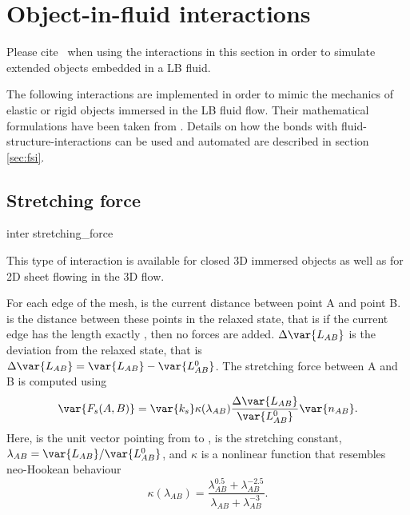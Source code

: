 \section{Object-in-fluid interactions}
\label{sec:inter-bonded-fsi}

\begin{citebox}
  Please cite~ when using the interactions
  in this section in order to simulate extended objects embedded in a
  LB fluid.
\end{citebox}

The following interactions are implemented in order to mimic the mechanics of 
elastic or rigid objects immersed in the LB fluid flow. Their mathematical formulations 
have been taken from \cite{dupin07}. Details on how the bonds with fluid-structure-interactions 
can be used and automated are described in section \ref{sec:fsi}.

\subsection{Stretching force}

\begin{essyntax}
  inter 
  stretching_force
   
\end{essyntax}
This type of interaction is available for closed 3D immersed objects as well as 
for 2D sheet flowing in the 3D flow. 

For each edge of the mesh,  is the current distance between point A 
and point B.  is the distance between these points in the relaxed 
state, that is if the current edge has the length exactly , then 
no forces are added. $\Delta \var{L_{AB}}$ is the deviation from the relaxed 
state, that is $\Delta \var{L_{AB}} = \var{L_{AB}} - \var{L_{AB}^0}$. The 
stretching force between A and B is computed using 
\begin{equation}
\var{F_s(A,B)} = \var{k_s}\kappa(\lambda_{AB})\frac{\Delta \var{L_{AB}}}
{\var{L^0_{AB}}}\var{n_{AB}}.
\end{equation}
Here,  is the unit vector pointing from  to ,  
is the stretching constant, $\lambda_{AB} = \var{L_{AB}}/\var{L_{AB}^0}$, and 
$\kappa$ is a nonlinear function that resembles neo-Hookean behaviour
\begin{equation}
\kappa(\lambda_{AB}) = \frac{\lambda_{AB}^{0.5} + \lambda_{AB}^{-2.5}}
{\lambda_{AB} + \lambda_{AB}^{-3}}.
\end{equation}

